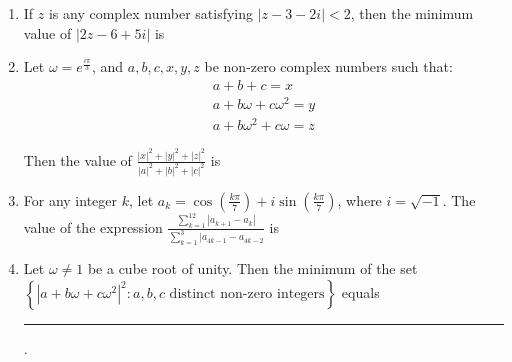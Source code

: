\documentclass[journal,12pt,twocolumn]{IEEEtran}
\theoremstyle{remark}
\begin{document}
\begin{enumerate}[label=\arabic*)]
	\item If $z$ is any complex number satisfying $|z - 3 - 2i| < 2$, then the
		minimum value of $|2z - 6 + 5i|$ is
		\hfill {}

	\item Let $\omega = e^{\frac{i\pi}3}$, and $a, b, c, x, y, z$ be non-zero complex numbers such that:
		\hfill {}
		\begin{gather*}
			a + b + c = x \\
			a + b\omega + c\omega^2 = y \\
			a + b\omega^2 + c\omega = z 
		\end{gather*}

		Then the value of $\frac {|x|^2 + |y|^2 + |z|^2} {|a|^2 + |b|^2 + |c|^2}$ is

	\item For any integer $k$, let $a_k = \cos(\frac{k\pi}7) + i\sin(\frac{k\pi}7)$, where
		$i = \sqrt{-1}$. The value of the expression $\frac {\sum_{k=1}^{12} |a_{k+1} - a_k|} {\sum_{k=1}^{3} |a_{4k-1} - a_{4k-2}}$ is
		\hfill {}

	\item Let $\omega \ne 1$ be a cube root of unity. Then the minimum of the set $\left\{|a + b\omega + c\omega^2|^2: a,b,c 
		\text{ distinct non-zero integers} \right\}$ equals \rule{1cm}{0.15mm}.
		\hfill {}
\end{enumerate}
\end{document}
